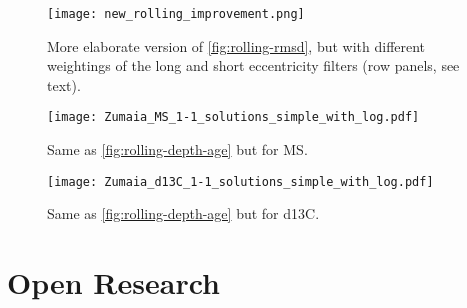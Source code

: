 \documentclass[draft]{agujournal2019}
\begin{document}
\begin{figure}[htb]
  \centering \texttt{[image: new\_rolling\_improvement.png]}
  \caption{\label{fig:rolling-rmsd-improvement}
    More elaborate version of \cref{fig:rolling-rmsd}, but with different weightings of the long and short eccentricity filters (row panels, see text).}
\end{figure}


\begin{figure}[htb]
  \centering
  \texttt{[image: Zumaia\_MS\_1-1\_solutions\_simple\_with\_log.pdf]}
  \caption{\label{fig:rolling-age-MS}
    Same as \cref{fig:rolling-depth-age} but for \gls{MS}.}
\end{figure}

\begin{figure}[htb]
  \centering
  \texttt{[image: Zumaia\_d13C\_1-1\_solutions\_simple\_with\_log.pdf]}
  \caption{\label{fig:rolling-age-d13C}
    Same as \cref{fig:rolling-depth-age} but for \gls{d13C}.}
\end{figure}

%
%

%

%



\section*{Open Research}
\end{document}
